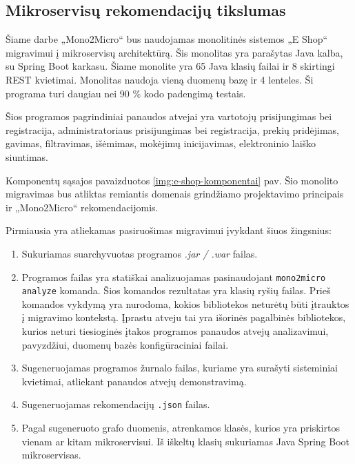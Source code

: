 \documentclass{VUMIFPSbakalaurinis}
\begin{document}
\subsection{Mikroservisų rekomendacijų tikslumas}
Šiame darbe „Mono2Micro“ bus naudojamas monolitinės sistemos „E Shop“ migravimui į mikroservisų architektūrą. Šis monolitas yra parašytas Java kalba, su Spring Boot karkasu. Šiame monolite yra 65 Java klasių failai ir 8 skirtingi REST kvietimai. Monolitas naudoja vieną duomenų bazę ir 4 lenteles. Ši programa turi daugiau nei 90 \% kodo padengimą testais.

Šios programos pagrindiniai panaudos atvejai yra vartotojų prisijungimas bei registracija, administratoriaus prisijungimas bei registracija, prekių pridėjimas, gavimas, filtravimas, išėmimas, mokėjimų inicijavimas, elektroninio laiško siuntimas.

Komponentų sąsajos pavaizduotos \ref{img:e-shop-komponentai} pav. Šio monolito migravimas bus atliktas remiantis domenais grindžiamo projektavimo principais ir „Mono2Micro“ rekomendacijomis.

Pirmiausia yra atliekamas pasiruošimas migravimui įvykdant šiuos žingsnius:
\begin{enumerate}
    \item Sukuriamas suarchyvuotas programos \emph{.jar / .war} failas. 

    \item Programos failas yra statiškai analizuojamas pasinaudojant \verb|mono2micro analyze| komanda. Šios komandos rezultatas yra klasių ryšių failas. Prieš komandos vykdymą yra nurodoma, kokios bibliotekos neturėtų būti įtrauktos į migravimo kontekstą. Įprastu atveju tai yra išorinės pagalbinės bibliotekos, kurios neturi tiesioginės įtakos programos panaudos atvejų analizavimui, pavyzdžiui, duomenų bazės konfigūraciniai failai.

    \item Sugeneruojamas programos žurnalo failas, kuriame yra surašyti sisteminiai kvietimai, atliekant panaudos atvejų demonstravimą.

    \item Sugeneruojamas rekomendacijų \verb|.json| failas.

    \item Pagal sugeneruoto grafo duomenis, atrenkamos klasės, kurios yra priskirtos vienam ar kitam mikroservisui. Iš iškeltų klasių sukuriamas Java Spring Boot mikroservisas.
    
\end{enumerate}
\end{document}
